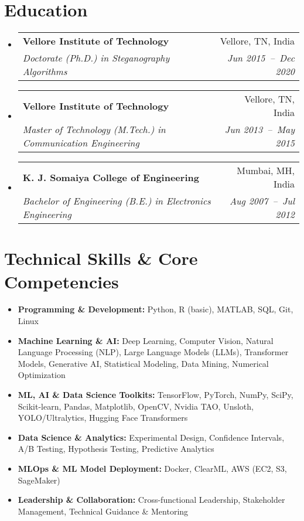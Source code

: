 \documentclass[a4paper,11pt]{article}
\makeatletter
\newcommand{\resumeSubheading}[4]{
  \vspace{-1pt}\item
    \begin{tabular*}{0.97\textwidth}[t]{l@{\extracolsep{\fill}}r}
      \textbf{#1} & #2 \\
      \textit{\small#3} & \textit{\small #4} \\
    \end{tabular*}\vspace{-5pt}
}
\newcommand{\resumeSubHeadingListStart}{\begin{itemize}[leftmargin=*]}
\newcommand{\resumeSubHeadingListEnd}{\end{itemize}}
\makeatother
\begin{document}
\section{Education}
  \resumeSubHeadingListStart
    \resumeSubheading
      {Vellore Institute of Technology}{Vellore, TN, India}
      {Doctorate (Ph.D.) in Steganography Algorithms}{Jun 2015~--~Dec 2020}
    \resumeSubheading
      {Vellore Institute of Technology}{Vellore, TN, India}
      {Master of Technology (M.Tech.) in Communication Engineering}{Jun 2013~--~May 2015}
    \resumeSubheading
      {K. J. Somaiya College of Engineering}{Mumbai, MH, India}
      {Bachelor of Engineering (B.E.) in Electronics Engineering}{Aug 2007~--~Jul 2012}
  \resumeSubHeadingListEnd

\section{Technical Skills \& Core Competencies}
	\begin{itemize}[leftmargin=*, itemsep = -2pt]
    \item{\textbf{Programming \& Development:} Python, R (basic), MATLAB, SQL, Git, Linux}
    \item{\textbf{Machine Learning \& AI:} Deep Learning, Computer Vision, Natural Language Processing (NLP), Large Language Models (LLMs), Transformer Models, Generative AI, Statistical Modeling, Data Mining, Numerical Optimization} 
		\item{\textbf{ML, AI \& Data Science Toolkits:} TensorFlow, PyTorch, NumPy, SciPy, Scikit-learn, Pandas, Matplotlib, OpenCV, Nvidia TAO, Unsloth, YOLO/Ultralytics, Hugging Face Transformers}
		\item {\textbf{Data Science \& Analytics:} Experimental Design, Confidence Intervals, A/B Testing, Hypothesis Testing, Predictive Analytics}
		\item{\textbf{MLOps \& ML Model Deployment:} Docker, ClearML, AWS (EC2, S3, SageMaker)}
    \item{\textbf{Leadership \& Collaboration:} Cross-functional Leadership, Stakeholder Management, Technical Guidance \& Mentoring}
    
	\end{itemize}

\end{document}

